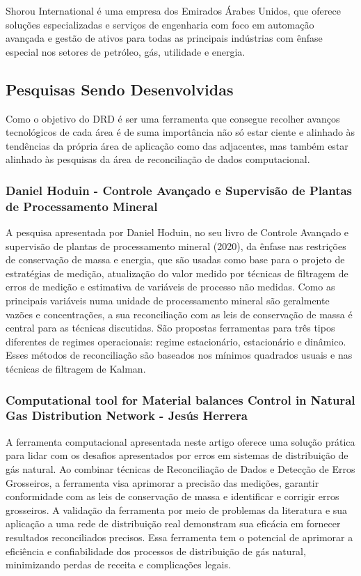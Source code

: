 Shorou International é uma empresa dos Emirados Árabes Unidos, que oferece soluções especializadas e serviços de engenharia com foco em automação avançada e gestão de ativos para todas as principais indústrias com ênfase especial nos setores de petróleo, gás, utilidade e energia.

\subsection{Pesquisas Sendo Desenvolvidas}

Como o objetivo do DRD é ser uma ferramenta que consegue recolher avanços tecnológicos de cada área é de suma importância não só estar ciente e alinhado às tendências da própria área de aplicação como das adjacentes, mas também estar alinhado às pesquisas da área de reconciliação de dados computacional. 

\subsubsection{Daniel Hoduin - Controle Avançado e Supervisão de Plantas de Processamento Mineral}

A pesquisa apresentada por Daniel Hoduin, no seu livro de Controle Avançado e supervisão de plantas de processamento mineral (2020), da  ênfase nas restrições de conservação de massa e energia, que são usadas como base para o projeto de estratégias de medição, atualização do valor medido por técnicas de filtragem de erros de medição e estimativa de variáveis de processo não medidas. Como as principais variáveis numa unidade de processamento mineral são geralmente vazões e concentrações, a sua reconciliação com as leis de conservação de massa é central para as técnicas discutidas. São propostas ferramentas para três tipos diferentes de regimes operacionais: regime estacionário, estacionário e dinâmico. Esses métodos de reconciliação são baseados nos mínimos quadrados usuais e nas técnicas de filtragem de Kalman.


\subsubsection{Computational  tool for Material balances Control in Natural Gas Distribution Network - Jesús Herrera}

A ferramenta computacional apresentada neste artigo oferece uma solução prática para lidar com os desafios apresentados por erros em sistemas de distribuição de gás natural. Ao combinar técnicas de Reconciliação de Dados e Detecção de Erros Grosseiros, a ferramenta visa aprimorar a precisão das medições, garantir conformidade com as leis de conservação de massa e identificar e corrigir erros grosseiros. A validação da ferramenta por meio de problemas da literatura e sua aplicação a uma rede de distribuição real demonstram sua eficácia em fornecer resultados reconciliados precisos. Essa ferramenta tem o potencial de aprimorar a eficiência e confiabilidade dos processos de distribuição de gás natural, minimizando perdas de receita e complicações legais.

